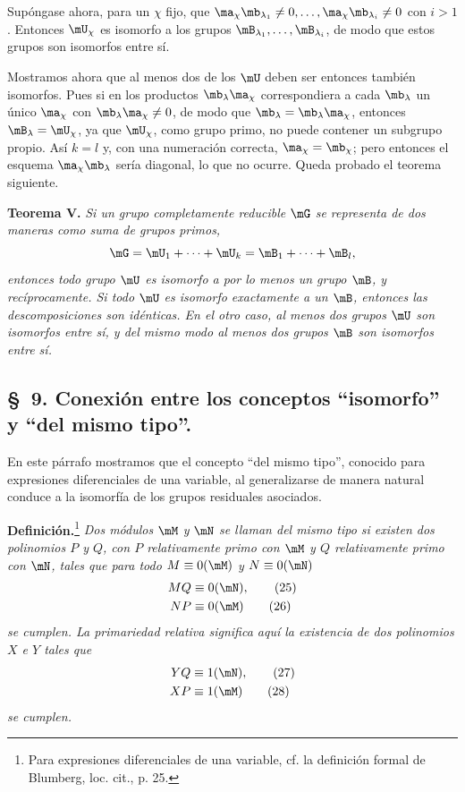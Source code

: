 \documentclass[11pt]{article}
\begin{document}
Supóngase ahora, para un $\chi$ fijo, que $\ma_\chi\mb_{\lambda_1}\ne0,\ldots,\ma_\chi\mb_{\lambda_i}\ne0$ con $i>1$. Entonces $\mU_\chi$ es isomorfo a los grupos $\mB_{\lambda_1},\ldots,\mB_{\lambda_i}$, de modo que estos grupos son isomorfos entre sí.

Mostramos ahora que al menos dos de los $\mU$ deben ser entonces también isomorfos. Pues si en los productos $\mb_\lambda\ma_\chi$ correspondiera a cada $\mb_\lambda$ un único $\ma_\chi$ con $\mb_\lambda\ma_\chi\ne0$, de modo que $\mb_\lambda=\mb_\lambda\ma_\chi$, entonces $\mB_\lambda=\mU_\chi$, ya que $\mU_\chi$, como grupo primo, no puede contener un subgrupo propio. Así $k=l$ y, con una numeración correcta, $\ma_\chi=\mb_\chi$; pero entonces el esquema $\ma_\chi\mb_\lambda$ sería diagonal, lo que no ocurre. Queda probado el teorema siguiente.

\textbf{Teorema V.} \emph{Si un grupo completamente reducible $\mG$ se representa de dos maneras como suma de grupos primos,
\[
 \mG=\mU_1+\cdots+\mU_k=\mB_1+\cdots+\mB_l,
\]
entonces todo grupo $\mU$ es isomorfo a por lo menos un grupo $\mB$, y recíprocamente. Si todo $\mU$ es isomorfo exactamente a un $\mB$, entonces las descomposiciones son idénticas. En el otro caso, al menos dos grupos $\mU$ son isomorfos entre sí, y del mismo modo al menos dos grupos $\mB$ son isomorfos entre sí.}

\subsection*{\S~9. Conexión entre los conceptos ``isomorfo'' y ``del mismo tipo''.}

En este párrafo mostramos que el concepto ``del mismo tipo'', conocido para expresiones diferenciales de una variable, al generalizarse de manera natural conduce a la isomorfía de los grupos residuales asociados.

\textbf{Definición.}\footnote{Para expresiones diferenciales de una variable, cf. la definición formal de Blumberg, loc. cit., p. 25.} \emph{Dos módulos $\mM$ y $\mN$ se llaman del mismo tipo si existen dos polinomios $P$ y $Q$, con $P$ relativamente primo con $\mM$ y $Q$ relativamente primo con $\mN$, tales que para todo $M\equiv0(\mM)$ y $N\equiv0(\mN)$}
\begin{align}
 MQ&\equiv0(\mN),\tag{25}\\
 NP&\equiv0(\mM)\tag{26}
\end{align}
\emph{se cumplen. La primariedad relativa significa aquí la existencia de dos polinomios $X$ e $Y$ tales que}
\begin{align}
 YQ&\equiv1(\mN),\tag{27}\\
 XP&\equiv1(\mM)\tag{28}
\end{align}
\emph{se cumplen.}
\end{document}
